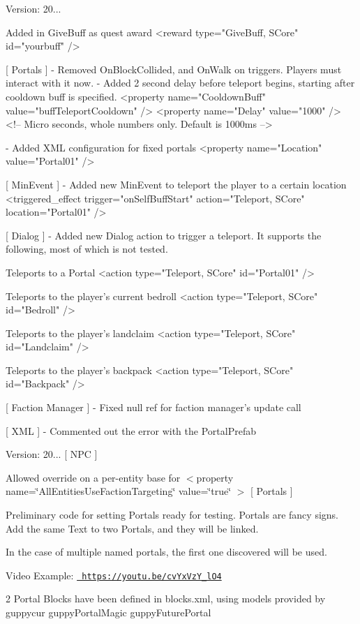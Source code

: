  Version\+: 20... \begin{DoxyVerb}[ Quests ]
    Added in GiveBuff as quest award
        <reward type="GiveBuff, SCore" id="yourbuff" />

[ Portals ]
    - Removed OnBlockCollided, and OnWalk on triggers. Players must interact with it now.
    - Added 2 second delay before teleport begins, starting after cooldown buff is specified.
        <property name="CooldownBuff" value="buffTeleportCooldown" />
        <property name="Delay" value="1000" /> <!-- Micro seconds, whole numbers only. Default is 1000ms  -->

    - Added XML configuration for fixed portals
        <property name="Location" value="Portal01" />

[ MinEvent ]
    - Added new MinEvent to teleport the player to a certain location
        <triggered_effect trigger="onSelfBuffStart" action="Teleport, SCore" location="Portal01" />

[ Dialog ]
    - Added new Dialog action to trigger a teleport. It supports the following, most of which is not tested.

        Teleports to a Portal
        <action type="Teleport, SCore" id="Portal01" />

        Teleports to the player's current bedroll
        <action type="Teleport, SCore" id="Bedroll" />

        Teleports to the player's landclaim
        <action type="Teleport, SCore" id="Landclaim" />

        Teleports to the player's backpack
        <action type="Teleport, SCore" id="Backpack" />

[ Faction Manager ]
    - Fixed null ref for faction manager's update call

[ XML ]
    - Commented out the error with the PortalPrefab
\end{DoxyVerb}


Version\+: 20... \mbox{[} NPC \mbox{]}
\begin{DoxyItemize}
\item Allowed override on a per-\/entity base for $<$property name=\char`\"{}\+All\+Entities\+Use\+Faction\+Targeting\char`\"{} value=\char`\"{}true\char`\"{} $>$ \mbox{[} Portals \mbox{]}
\item Preliminary code for setting Portals ready for testing. Portals are fancy signs. Add the same Text to two Portals, and they will be linked.
\begin{DoxyItemize}
\item In the case of multiple named portals, the first one discovered will be used.
\end{DoxyItemize}

Video Example\+: \href{https://youtu.be/cvYxVzY_lO4}{\texttt{ https\+://youtu.\+be/cv\+Yx\+Vz\+Y\+\_\+l\+O4}}

2 Portal Blocks have been defined in blocks.\+xml, using models provided by guppycur guppy\+Portal\+Magic guppy\+Future\+Portal
\end{DoxyItemize}

